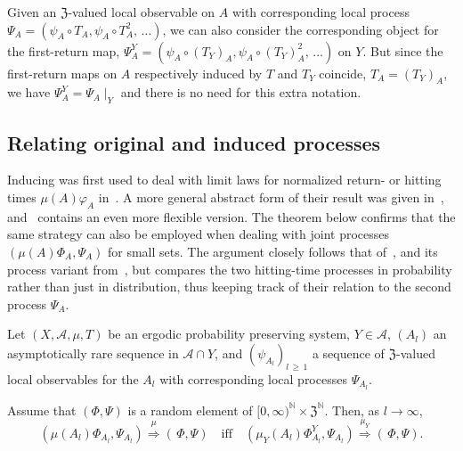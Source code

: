 \documentclass[AHL,Unicode,longabstracts]{cedram}
\newcommand{\clA}{\mathcal{A}}
\newcommand{\frkZ}{\mathfrak{Z}}
\newcommand{\bbN}{\mathbb{N}}
\begin{document}
Given an $\frkZ$-valued local observable on $A$ with corresponding local process $\Psi_{A}=(\psi_{A}\circ T_{A},\psi_{A}\circ T_{A}^{2},\,\ldots)$, we can also consider the corresponding object for the first-return map, $\Psi_{A}^{Y}=(\psi_{A}\circ(T_{Y})_{A},\psi_{A}\circ(T_{Y})_{A}^{2},\,\ldots)$ on $Y$. But since the first-return maps on $A$ respectively induced by $T$ and $T_{Y}$ coincide, $T_{A}=(T_{Y})_{A}$, we have $\Psi_{A}^{Y}=\Psi_{A}\mid_{Y}$ and there is no need for this extra notation.

\subsection{Relating original and induced processes}
Inducing was first used to deal with limit laws for normalized return- or hitting times $\mu (A)\varphi_{A}$ in~\cite{BruSauTrouVai}. A more general abstract form of their result was given in~\cite{HWZ}, and~\cite{Zexceptional} contains an even more flexible version. The theorem below confirms that the same strategy can also be employed when dealing with joint processes $(\mu(A)\Phi_{A},\Psi_{A})$ for small sets. The argument closely follows that of~\cite{HWZ}, and its process variant from~\cite{FFTV}, but compares the two hitting-time processes in probability rather than just in distribution, thus keeping track of their relation to the second process $\Psi_{A}$.

\begin{theo}\label{T_InduceSpatioTempMu}
Let $(X,\clA,\mu,T)$ be an ergodic probability preserving system, $Y\in\clA$, $(A_{l})$ an asymptotically rare sequence in $\clA\cap Y$, and $(\psi_{A_{l}})_{l\,\geq\,1}$ a sequence of $\frkZ$-valued local observables for the $A_{l}$ with corresponding local processes $\Psi_{A_{l}}$.

Assume that $(\Phi,\Psi)$ is a random element of $[0,\infty)^{\bbN }\times\frkZ^{\bbN}$. Then, as $l\rightarrow\infty$,
\begin{equation}\label{Eq_cvcvcvcvcvbbbbbbbb}
\left(\mu(A_{l})\Phi_{A_{l}},\Psi_{A_{l}}\right)\overset{\mu}{\Longrightarrow} (\,\Phi,\Psi)\quad\text{iff}\quad(\mu_{Y}(A_{l})\Phi_{A_{l}}^{Y},\Psi_{A_{l} })\overset{\mu_{Y}}{\Longrightarrow}(\,\Phi,\Psi).
\end{equation}
\end{theo}
\end{document}
